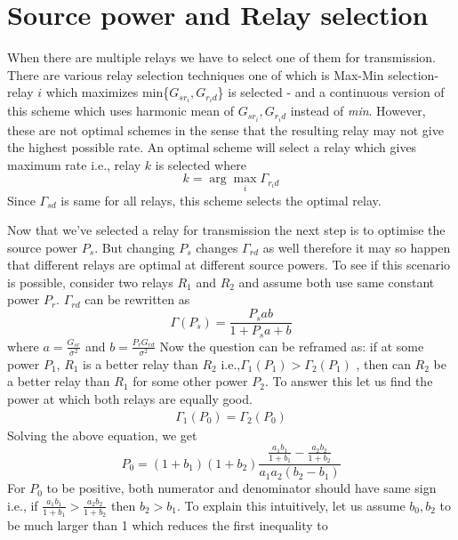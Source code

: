 \documentclass[conference]{IEEEtran}
\begin{document}
\section{Source power and Relay selection}
When there are multiple relays we have to select one of them for transmission. 
There are various relay selection techniques one of which is Max-Min selection-
relay $i$ which maximizes min\{$G_{sr_i},G_{r_id}$\} is selected -  and a 
continuous version of this scheme which uses harmonic mean of $G_{sr_i},G_{r_id}$
instead of \textit{min}. However, these are not optimal schemes in the sense that
the resulting relay may not give the highest possible rate. An optimal scheme
will select a relay which gives maximum rate i.e., relay $k$ is selected
where 
\begin{equation}
	k = \arg \max\limits_{i} \Gamma_{r_id}
\end{equation}
Since $\Gamma_{sd}$ is same for all relays, this scheme selects the optimal
relay. 
\par
Now that we've selected a relay for transmission the next step is 
to optimise the source power $P_s$. But changing $P_s$ changes $\Gamma_{rd}$ as
well therefore it may so happen that different relays are optimal at different
source powers. To see if this scenario is possible, consider two
relays $R_1$ and $R_2$ and assume both use same constant power $P_r$.
$\Gamma_{rd}$ can be rewritten as
\begin{equation}
	\Gamma(P_s) = \frac{P_s ab}{1+P_s a + b} 
\end{equation}
where $a = \frac{G_{sr}}{\sigma^2}$ and $b = \frac{P_{r} G_{r d}}{\sigma^2}$
Now the question can be reframed as: if at some power $P_1$, $R_1$ is a better
relay than $R_2$ i.e.,$\Gamma_1(P_1) > \Gamma_2(P_1)$ , then can $R_2$ be 
a better relay than $R_1$ for some other power $P_2$. To answer this 
let us find the power at which both relays are equally good.
\begin{align*}
	\Gamma_1(P_0) = \Gamma_2(P_0)
\end{align*}
Solving the above equation, we get
\begin{equation}
	P_0 = (1+b_1)(1+b_2) \frac{\frac{a_1b_1}{1+b_1} - 
	\frac{a_2b_2}{1+b_2}}{a_1a_2(b_2-b_1)}
\end{equation}
For $P_0$ to be positive, both numerator and denominator should 
have same sign i.e., if 
$\frac{a_1b_1}{1+b_1} >	\frac{a_2b_2}{1+b_2}$ then $b_2 > b_1$.
To explain this intuitively, let us assume $b_0,b_2$ to be 
much larger than 1 which reduces the first inequality to
\end{document}
